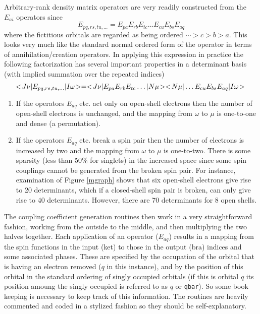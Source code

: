 Arbitrary-rank density matrix operators are very readily constructed
from the $E_{ai}$ operators \cite{knowleseai} since
\begin{equation}
 E_{pq,rs,tu,\ldots} =
E_{pa}E_{rb}E_{tc}\ldots E_{cu}E_{bs}E_{aq}
\end{equation}
where the fictitious orbitals are regarded as being ordered
$\cdots>c>b>a$.  This looks very much like the standard normal ordered
form of the operator in terms of annihilation/creation operators.  In
applying this expression in practice the following factorization has
several important properties in a determinant basis (with implied
summation over the repeated indices)
\begin{equation}
 < \! J\nu |E_{pq,rs,tu,\ldots}| I \omega \! > = 
 < \! J\nu |E_{pa}E_{rb}E_{tc}\ldots |N\mu \! >
 < \! N\mu |\ldots E_{cu}E_{bs}E_{aq}|I\omega \! > \\
\end{equation}
\begin{enumerate}
\item If the operators $E_{aq}$ etc. act only on open-shell electrons
then the number of open-shell electrons is unchanged, and the mapping
from $\omega$ to $\mu$ is  one-to-one and dense (a permutation).
\item If the operators $E_{aq}$ etc. break a spin pair then the number
of electrons is increased by two and the mapping from $\omega$ to
$\mu$ is one-to-two.  There is some sparsity (less than 50\% for
singlets) in the increased space since some spin couplings cannot be
generated from the broken spin pair. For instance, examination of
Figure \ref{mgraph} shows that six open-shell electrons give rise to
20 determinants, which if a closed-shell spin pair is broken, can only
give rise to 40 determinants.  However, there are 70 determinants for
8 open shells.
\end{enumerate}

The coupling coefficient generation routines then work in a very
straightforward fashion, working from the outside to the middle, and
then multiplying the two halves together.  Each application of an
operator ($E_{aq}$) results in a mapping from the spin functions in
the input (ket) to those in the output (bra) indices and some
associated phases.  These are specified by the occupation of the
orbital that is having an electron removed ($q$ in this instance), and
by the position of this orbital in the standard ordering of singly
occupied orbitals (if this is orbital $q$ its position amoung the
singly occupied is referred to as $\overline{q}$ or \verb+qbar+).  So
some book keeping is necessary to keep track of this information.  The
routines are heavily commented and coded in a stylized fashion so they
should be self-explanatory.

